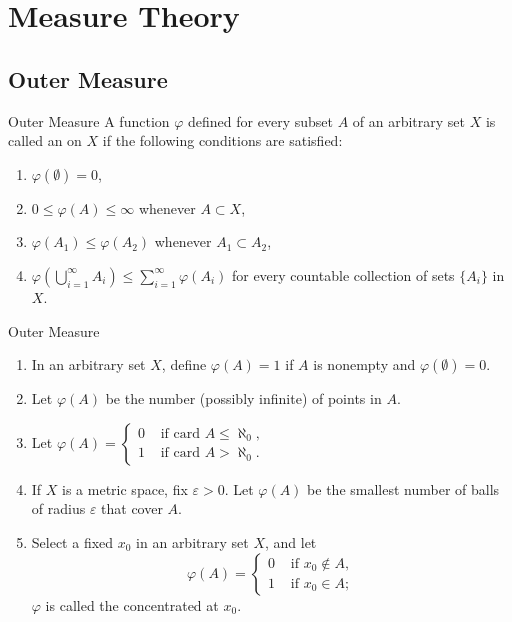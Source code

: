 \documentclass[../main.tex]{subfiles}
\begin{document}
\ifSubfilesClassLoaded{

    \tableofcontents
    
}{}

\chapter{Measure Theory}

\section{Outer Measure}
\begin{definition}{Outer Measure}{}
A function $\varphi$ defined for every subset $A$ of an arbitrary set $X$ is called an  on $X$ if the following conditions are satisfied:
\begin{enumerate}
    \item[(i)] $\varphi(\emptyset) = 0$,
    \item[(ii)] $0 \leq \varphi(A) \leq \infty$ whenever $A \subset X$,
    \item[(iii)] $\varphi(A_1) \leq \varphi(A_2)$ whenever $A_1 \subset A_2$,
    \item[(iv)] $\varphi(\bigcup_{i=1}^{\infty} A_i) \leq \sum_{i=1}^{\infty} \varphi(A_i)$ for every countable collection of sets $\{A_i\}$ in $X$.
\end{enumerate}
\end{definition}

\begin{example}{Outer Measure}{}
\begin{enumerate}
\item[(i)] In an arbitrary set $X$, define $\varphi(A) = 1$ if $A$ is nonempty and $\varphi(\emptyset) = 0$.
\item[(ii)] Let $\varphi(A)$ be the number (possibly infinite) of points in $A$.
\item[(iii)] Let $\varphi(A)=\left\{\begin{array}{ll} 0 & \text { if card } A \leq \aleph_{0}, \\ 1 & \text { if card } A > \aleph_{0} . \end{array}\right.$
\item[(iv)] If $X$ is a metric space, fix $\varepsilon > 0$. Let $\varphi(A)$ be the smallest number of balls of radius $\varepsilon$ that cover $A$.
\item[(v)] Select a fixed $x_0$ in an arbitrary set $X$, and let
\[
\varphi(A)=\left\{\begin{array}{ll}
0 & \text { if } x_{0} \notin A, \\
1 & \text { if } x_{0} \in A;
\end{array}\right.
\]
$\varphi$ is called the  concentrated at $x_0$.
\end{enumerate}
\end{example}
\end{document}

